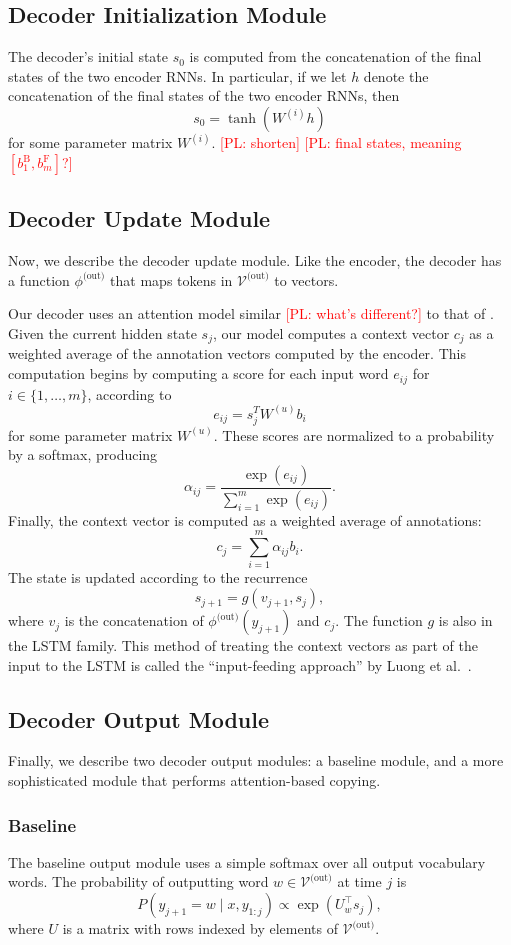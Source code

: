 \documentclass[11pt,letterpaper]{article}
\newcommand{\vocabout}{\mathcal{V}^{\text{(out)}}}
\newcommand{\phiout}{\phi^{\text{(out)}}}
\newcommand\pl[1]{\textcolor{red}{[PL: #1]}}
\begin{document}
\subsection{Decoder Initialization Module}
The decoder's initial state $s_0$ is computed from 
the concatenation of the final states of the two encoder RNNs.
In particular, if we let $h$ denote the
concatenation of the final states of the two encoder RNNs, then
\[
  s_0 = \tanh(W^{(i)} h)
\]
for some parameter matrix $W^{(i)}$.
\pl{shorten}
\pl{final states, meaning $[b_1^\text{B}, b_m^\text{F}]$?}

\subsection{Decoder Update Module}
Now, we describe the decoder update module.
Like the encoder, the decoder has a function $\phiout$
that maps tokens in $\vocabout$ to vectors.

Our decoder uses an attention model similar \pl{what's different?}
to that of .
Given the current hidden state $s_j$, our model computes
a context vector $c_j$ as a weighted average of the annotation vectors
computed by the encoder.
This computation begins by computing a score for each input word $e_{ij}$ 
for $i \in \{1, \dotsc, m\}$, according to
\[
  e_{ij} = s_{j}^T W^{(u)} b_i
\]
for some parameter matrix $W^{(u)}$.
These scores are normalized to a probability by a softmax, producing \[
  \alpha_{ij} = \frac{\exp(e_{ij})}{\sum_{i=1}^m \exp(e_{ij})}.
\]
Finally, the context vector is computed as a weighted average of annotations: \[
  c_j = \sum_{i=1}^m \alpha_{ij} b_i.
\]
The state is updated according to the recurrence \[
  s_{j+1} = g(v_{j+1}, s_{j}),
\]
where $v_j$ is the concatenation of $\phiout(y_{j+1})$ and $c_{j}$.
The function $g$ is also in the LSTM family.
This method of treating the context vectors as part of the
input to the LSTM is called the ``input-feeding approach''
by Luong et al.~.

\subsection{Decoder Output Module}
Finally, we describe two decoder output modules: a baseline module, and a
more sophisticated module that performs attention-based copying.

\subsubsection{Baseline}
\label{sec:baseline-output}
The baseline output module uses a simple softmax over all
output vocabulary words.
The probability of outputting word $w \in \vocabout$ at time $j$ is \[
  P(y_{j+1} = w \mid x, y_{1:j}) \propto \exp(U_{w}^\top s_j),
\]
where $U$ is a matrix with rows indexed by elements of $\vocabout$.
\end{document}
